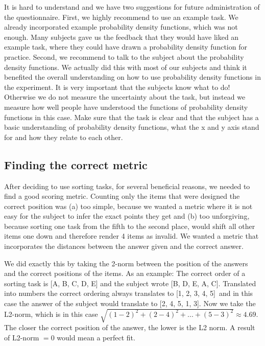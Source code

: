 \documentclass[../main/main.tex]{subfiles}
\begin{document}
	It is hard to understand and we have two suggestions for future administration of the questionnaire. First, we highly recommend to use an example task. We already incorporated example probability density functions, which was not enough. Many subjects gave us the feedback that they would have liked an example task, where they could have drawn a probability density function for practice. Second, we recommend to talk to the subject about the probability density functions. We actually did this with most of our subjects and think it benefited the overall understanding on how to use probability density functions in the experiment. It is very important that the subjects know what to do! Otherwise we do not measure the uncertainty about the task, but instead we measure how well people have understood the functions of probability density functions in this case. Make sure that the task is clear and that the subject has a basic understanding of probability density functions, what the x and y axis stand for and how they relate to each other.
	
	\subsection{Finding the correct metric}
	\label{sec:finding_metric}
	
	After deciding to use sorting tasks, for several beneficial reasons, we needed to find a good scoring metric. Counting only the items that were designed the correct position was (a) too simple, because we wanted a metric where it is not easy for the subject to infer the exact points they get and (b) too unforgiving, because sorting one task from the fifth to the second place, would shift all other items one down and therefore render 4 items as invalid. We wanted a metric that incorporates the distances between the answer given and the correct answer.
	
	We did exactly this by taking the 2-norm between the position of the answers and the correct positions of the items. As an example: The correct order of a sorting task is [A, B, C, D, E] and the subject wrote [B, D, E, A, C]. Translated into numbers the correct ordering always translates to [1, 2, 3, 4, 5] and in this case the answer of the subject would translate to [2, 4, 5, 1, 3]. Now we take the L2-norm, which is in this case $\sqrt{(1-2)^2 + (2-4)^2 + ...  + (5 - 3)^2} \approx 4.69$. The closer the correct position of the answer, the lower is the L2 norm. A result of L2-norm $= 0$ would mean a perfect fit.
	
\end{document}
